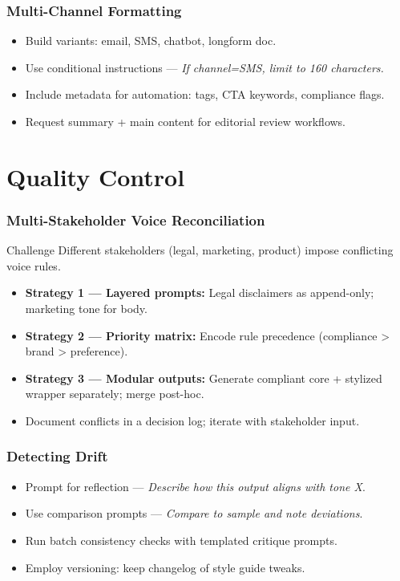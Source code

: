 \documentclass{beamer}
\begin{document}
\begin{frame}
    \frametitle{Multi-Channel Formatting}
    \begin{itemize}
        \item Build variants: email, SMS, chatbot, longform doc.
    \item Use conditional instructions — \emph{If channel=SMS, limit to 160 characters.} 
        \item Include metadata for automation: tags, CTA keywords, compliance flags.
        \item Request summary + main content for editorial review workflows.
    \end{itemize}
\end{frame}

\section{Quality Control}

\begin{frame}
    \frametitle{Multi-Stakeholder Voice Reconciliation}
    \begin{block}{Challenge}
        Different stakeholders (legal, marketing, product) impose conflicting voice rules.
    \end{block}
    \begin{itemize}
        \item \textbf{Strategy 1 — Layered prompts:} Legal disclaimers as append-only; marketing tone for body.
        \item \textbf{Strategy 2 — Priority matrix:} Encode rule precedence (compliance > brand > preference).
        \item \textbf{Strategy 3 — Modular outputs:} Generate compliant core + stylized wrapper separately; merge post-hoc.
        \item Document conflicts in a decision log; iterate with stakeholder input.
    \end{itemize}
\end{frame}

\begin{frame}
    \frametitle{Detecting Drift}
    \begin{itemize}
        \item Prompt for reflection — \emph{Describe how this output aligns with tone X}.
        \item Use comparison prompts — \emph{Compare to sample and note deviations}.
        \item Run batch consistency checks with templated critique prompts.
        \item Employ versioning: keep changelog of style guide tweaks.
    \end{itemize}
\end{frame}
\end{document}
